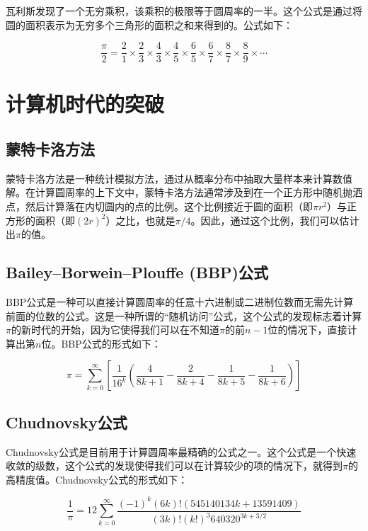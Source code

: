 \documentclass{ctexart}
\begin{document}
瓦利斯发现了一个无穷乘积，该乘积的极限等于圆周率的一半。这个公式是通过将圆的面积表示为无穷多个三角形的面积之和来得到的\cite{wallis}。公式如下：

\[
    \frac{\pi}{2} = \frac{2}{1} \times \frac{2}{3} \times \frac{4}{3} \times \frac{4}{5} \times \frac{6}{5} \times \frac{6}{7} \times \frac{8}{7} \times \frac{8}{9} \times \cdots
\]


\section{计算机时代的突破}

\subsection{蒙特卡洛方法}

蒙特卡洛方法是一种统计模拟方法，通过从概率分布中抽取大量样本来计算数值解。在计算圆周率的上下文中，蒙特卡洛方法通常涉及到在一个正方形中随机抛洒点，然后计算落在内切圆内的点的比例。这个比例接近于圆的面积（即$\pi r^2$）与正方形的面积（即$(2r)^2$）之比，也就是$\pi/4$。因此，通过这个比例，我们可以估计出$\pi$的值\cite{montecarlo}。

\subsection{Bailey–Borwein–Plouffe (BBP)公式}

BBP公式是一种可以直接计算圆周率的任意十六进制或二进制位数而无需先计算前面的位数的公式。这是一种所谓的“随机访问”公式，这个公式的发现标志着计算$\pi$的新时代的开始，因为它使得我们可以在不知道$\pi$的前$n-1$位的情况下，直接计算出第$n$位\cite{bbp}。BBP公式的形式如下：

\[
    \pi = \sum_{k=0}^{\infty} \left[ \frac{1}{16^k} \left( \frac{4}{8k+1} - \frac{2}{8k+4} - \frac{1}{8k+5} - \frac{1}{8k+6} \right) \right]
\]

\subsection{Chudnovsky公式}

Chudnovsky公式是目前用于计算圆周率最精确的公式之一。这个公式是一个快速收敛的级数，这个公式的发现使得我们可以在计算较少的项的情况下，就得到$\pi$的高精度值\cite{chudnovsky}。Chudnovsky公式的形式如下：

\[
    \frac{1}{\pi} = 12 \sum_{k=0}^{\infty} \frac{(-1)^k (6k)!(545140134k+13591409)}{(3k)!(k!)^3 640320^{3k+3/2}}
\]
\end{document}
